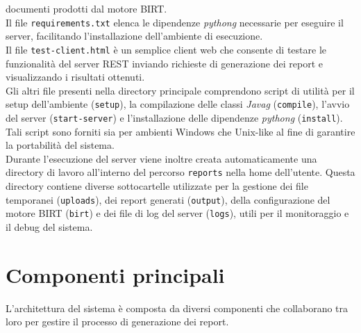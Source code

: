 documenti prodotti dal motore BIRT.\\
Il file \texttt{requirements.txt} elenca le dipendenze \emph{\gls{pythong}} necessarie per eseguire il server, facilitando l'installazione dell'ambiente di esecuzione.\\
Il file \texttt{test-client.html} è un semplice client web che consente di testare le funzionalità del server REST inviando richieste di generazione dei report e visualizzando i risultati ottenuti.\\
Gli altri file presenti nella directory principale comprendono script di utilità per il setup dell'ambiente (\texttt{setup}), la compilazione delle classi \emph{\gls{Javag}}
(\texttt{compile}), l'avvio del server (\texttt{start-server}) e
l'installazione delle dipendenze \emph{\gls{pythong}} (\texttt{install}). Tali script sono
forniti sia per ambienti Windows che Unix-like al fine di garantire la
portabilità del sistema.\\
Durante l'esecuzione del server viene inoltre creata automaticamente una
directory di lavoro all'interno del percorso \texttt{reports} nella home
dell'utente. Questa directory contiene diverse sottocartelle utilizzate per la
gestione dei file temporanei (\texttt{uploads}), dei report generati
(\texttt{output}), della configurazione del motore BIRT (\texttt{birt}) e dei
file di log del server (\texttt{logs}), utili per il monitoraggio e il debug
del sistema.

\section{Componenti principali}
L'architettura del sistema è composta da diversi componenti che collaborano tra loro per gestire il processo di generazione dei report.

